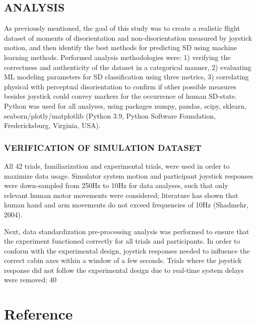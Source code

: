 \documentclass[11pt, onecolumn]{article}
\begin{document}
\subsection{ANALYSIS}
As previously mentioned, the goal of this study was to create a realistic flight dataset of moments of disorientation and non-disorientation measured by joystick motion, and then identify the best methods for predicting SD using machine learning methods.  Performed analysis methodologies were: 1) verifying the correctness and authenticity of the dataset in a categorical manner, 2) evaluating ML modeling parameters for SD classification using three metrics, 3) correlating physical with perceptual disorientation to confirm if other possible measures besides joystick could convey markers for the occurrence of human SD-state.  Python was used for all analyses, using packages numpy, pandas, scipy, sklearn, seaborn/plotly/matplotlib  (Python 3.9, Python Software Foundation, Fredericksburg, Virginia, USA).

\subsubsection{VERIFICATION OF SIMULATION DATASET}
All 42 trials, familiarization and experimental trials, were used in order to maximize data usage.  Simulator system motion and participant joystick responses were down-sampled from 250Hz to 10Hz for data analyses, such that only relevant human motor movements were considered; literature has shown that human hand and arm movements do not exceed frequencies of 10Hz (Shadmehr, 2004).

Next, data standardization pre-processing analysis was performed to ensure that the experiment functioned correctly for all trials and participants.  In order to conform with the experimental design, joystick responses needed to influence the correct cabin axes within a window of a few seconds.  Trials where the joystick response did not follow the experimental design due to real-time system delays were removed; 40%





\section{Reference}

\end{document}
